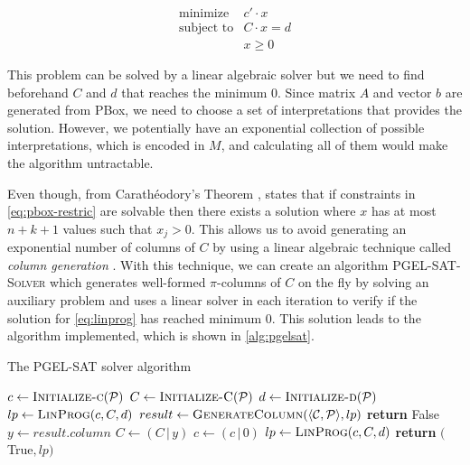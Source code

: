 \begin{equation}
	\label{eq:linprog}
	\begin{array}{ll}
		\text{minimize}   & c' \cdot x    \\
		\text{subject to} & C \cdot x = d \\
		                  & x \geq 0
	\end{array}
\end{equation}

This problem can be solved by a linear algebraic solver but we need to find beforehand $C$ and $d$ that reaches the minimum 0. Since matrix $A$ and vector $b$ are generated from PBox, we need to choose a set of interpretations that provides the solution. However, we potentially have an exponential collection of possible interpretations, which is encoded in $M$, and calculating all of them would make the algorithm untractable.

Even though, from Carathéodory's Theorem \citep{eckhoff1993helly}, \citet{Fin2020} states that if constraints in \cref{eq:pbox-restric} are solvable then there exists  a solution where $x$ has at most $n + k + 1$ values such that $x_j > 0$. This allows us to avoid generating an exponential number of columns of $C$ by using a linear algebraic technique called \emph{column generation} \citep{gilmore1961linear,gilmore1963linear}. With this technique, we can create an algorithm \textsc{PGEL-SAT-Solver} which generates well-formed $\pi$-columns of $C$ on the fly by solving an auxiliary problem and uses a linear solver in each iteration to verify if the solution for \cref{eq:linprog} has reached minimum 0. This solution leads to the algorithm implemented, which is shown in \cref{alg:pgelsat}.

\begin{algorithm}
	\caption{The PGEL-SAT solver algorithm}
	\label{alg:pgelsat}
	\begin{algorithmic}[1]
		\State $c \gets \Call{Initialize-c}{\PP}$
		\State $C \gets \Call{Initialize-C}{\PP}$
		\State $d \gets \Call{Initialize-d}{\PP}$
		\Statex
		\State $lp \gets \Call{LinProg}{c, C, d}$
		\Statex
		\State $result \gets \Call{GenerateColumn}{\tuple{\CC, \PP}, lp}$
		\State \textbf{return} False 
		\EndIf
		\Statex
		\State $y \gets result.column$ 
		\State $C \gets ( C \, | \, y) $
		\State $c \gets (c \, | \, 0)$
		\State $lp \gets \Call{LinProg}{c, C, d}$
		\EndWhile
		\Statex
		\State \textbf{return} $($True$, lp)$ 
		\EndFunction
	\end{algorithmic}
\end{algorithm}

